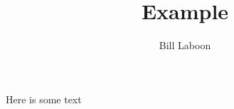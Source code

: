 \documentclass{article}
\begin{document}
\title {Example}
\author {Bill Laboon}

\maketitle

Here is some text
\end{document}
